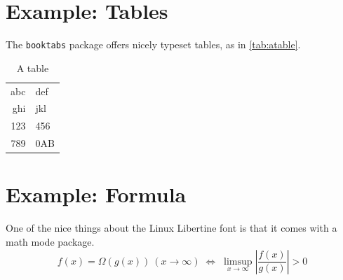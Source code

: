\section{Example: Tables}
The \texttt{booktabs} package offers nicely typeset tables, as in \autoref{tab:atable}.

\label{sec:Introduction:Tables}
\begin{table}
\centering
\begin{tabular}{r l}
\toprule
abc & def\\
ghi & jkl\\
\midrule
123 & 456\\
789 & 0AB\\
\bottomrule
\end{tabular}
\caption{A table}
\label{tab:atable}
\end{table}

\section{Example: Formula}
One of the nice things about the Linux Libertine font is that it comes with
a math mode package.
\begin{displaymath}
f(x)=\Omega(g(x))\ (x\rightarrow\infty)\;\Leftrightarrow\;
\limsup_{x \to \infty} \left|\frac{f(x)}{g(x)}\right|> 0
\end{displaymath}

